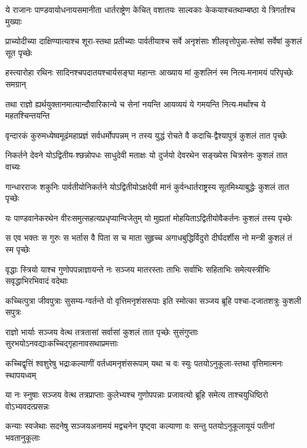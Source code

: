 \twolineshloka
{ये राजानः पाण्डवायोधनायसमानीता धार्तराष्ट्रेण केचित्}
{वशातयः साल्वकाः केकयाश्चतथाम्बष्ठा ये त्रिगर्ताश्च मुख्याः}


\twolineshloka
{प्राच्योदीच्या दाक्षिण्यात्याश्च शूरा-स्तथा प्रतीच्याः पार्वतीयाश्च सर्वे}
{अनृशंसाः शीलवृत्तोपुन्ना-स्तेषां सर्वेषां कुशलं सूत पृच्छेः}


\twolineshloka
{हस्त्यारोहा रथिनः सादिनश्चपदातयश्चार्यसङ्घा महान्तः}
{आख्याय मां कुशलिनं स्म नित्य-मनामयं परिपृच्छेः समग्रान्}


\twolineshloka
{तथा राज्ञो ह्यर्थयुक्तानमात्यान्दौवारिकान्ये च सेनां नयन्ति}
{आयव्ययं ये गमयन्ति नित्य-मर्थांश्च ये महतश्चिन्तयन्ति}


\twolineshloka
{वृन्दारकं कुरुमध्येष्वमूढंमहाप्रज्ञं सर्वधर्मोपपन्नम्}
{न तस्य युद्धं रोचते वै कदाचि-द्वैश्यापुत्रं कुशलं तात पृच्छेः}


\twolineshloka
{निकर्तने देवने योऽद्वितीय-श्छन्नोपधः साधुदेवी मताक्षः}
{यो दुर्जयो देवरथेन सङ्ख्येस चित्रसेनः कुशलं तात वाच्यः}


\twolineshloka
{गान्धारराजः शकुनिः पार्वतीयोनिकर्तने योऽद्वितीयोऽक्षदेवी}
{मानं कुर्वन्धार्तराष्ट्रस्य सूतमिथ्याबुद्धेः कुशलं तात पृच्छेः}


\twolineshloka
{यः पाण्डवानेकरथेन वीरःसमुत्सहत्यप्रधृप्यान्विजेतुम्}
{यो मुह्यतां मोहयिताऽद्वितीयोवैकर्तनः कुशलं तस्य पृच्छेः}


\twolineshloka
{स एव भक्तः स गुरुः स भर्तास वै पिता स च माता सुहृच्च}
{अगाधबुद्धिर्विदुरो दीर्घदर्शीस नो मन्त्री कुशलं तं स्म पृच्छेः}


\twolineshloka
{वृद्धाः स्त्रियो याश्च गुणोपपन्नाज्ञायन्ते नः सञ्जय मातरस्ताः}
{ताभिः सर्वाभिः सहिताभिः समेत्यस्त्रीभिः सवृद्धाभिरभिवादं वदेथाः}


\twolineshloka
{कच्चित्पुत्रा जीवपुत्राः सुसम्य-ग्वर्तन्ते वो वृत्तिमनृशंसरूपाः}
{इति स्मोत्का सञ्जय ब्रूहि पश्चा-दजातशत्रुः कुशली सपुत्रः}


\twolineshloka
{राज्ञो भार्याः सञ्जय वेत्थ तत्रतासां सर्वासां कुशलं तात पृच्छेः}
{सुसंगुप्ताः सुरभयोऽनवद्याःकच्चिद्गृहानावसथाप्रमत्ताः}


\twolineshloka
{कच्चिद्वृत्तिं श्वशुरेषु भद्राःकल्याणीं वर्तध्वमनृशंसरूपाम्}
{यथा च वः स्युः पतयोऽनुकूला-स्तथा वृत्तिमात्मनः स्थापयध्वम्}


\twolineshloka
{या नः स्नुषाः सञ्जय वेत्थ तत्रप्राप्ताः कुलेभ्यश्च गुणोपपन्नाः}
{प्रजावत्यो ब्रूहि समेत्य ताश्चयुधिष्ठिरो वोऽभ्यवदत्प्रसन्नः}


\twolineshloka
{कन्याः स्वजेथाः सदनेषु सञ्जयअनामयं मद्वचनेन पृष्ट्वा}
{कल्याणा वः सन्तु पतयोऽनुकूलायूयं पतीनां भवतानुकूलाः}


